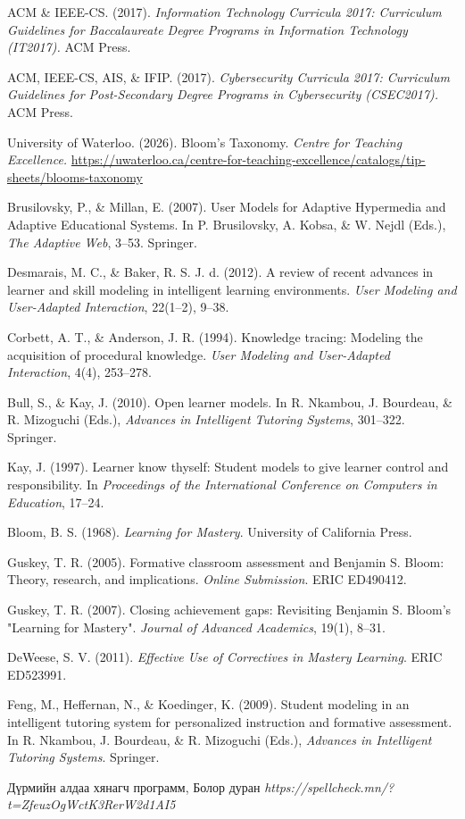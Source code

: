 \documentclass[12pt,A4]{report}
\begin{document}
\begin{thebibliography}{}
ACM \& IEEE-CS. (2017).
\textit{Information Technology Curricula 2017: Curriculum Guidelines for Baccalaureate Degree Programs in Information Technology (IT2017).}
ACM Press.

ACM, IEEE-CS, AIS, \& IFIP. (2017).
\textit{Cybersecurity Curricula 2017: Curriculum Guidelines for Post-Secondary Degree Programs in Cybersecurity (CSEC2017).}
ACM Press.

University of Waterloo. (2026).
Bloom's Taxonomy.
\textit{Centre for Teaching Excellence.}
\url{https://uwaterloo.ca/centre-for-teaching-excellence/catalogs/tip-sheets/blooms-taxonomy}

Brusilovsky, P., \& Millan, E. (2007).
User Models for Adaptive Hypermedia and Adaptive Educational Systems.
In P. Brusilovsky, A. Kobsa, \& W. Nejdl (Eds.), \textit{The Adaptive Web}, 3--53. Springer.

Desmarais, M. C., \& Baker, R. S. J. d. (2012).
A review of recent advances in learner and skill modeling in intelligent learning environments.
\textit{User Modeling and User-Adapted Interaction}, 22(1--2), 9--38.

Corbett, A. T., \& Anderson, J. R. (1994).
Knowledge tracing: Modeling the acquisition of procedural knowledge.
\textit{User Modeling and User-Adapted Interaction}, 4(4), 253--278.

Bull, S., \& Kay, J. (2010).
Open learner models.
In R. Nkambou, J. Bourdeau, \& R. Mizoguchi (Eds.), \textit{Advances in Intelligent Tutoring Systems}, 301--322. Springer.

Kay, J. (1997).
Learner know thyself: Student models to give learner control and responsibility.
In \textit{Proceedings of the International Conference on Computers in Education}, 17--24.

Bloom, B. S. (1968).
\textit{Learning for Mastery}.
University of California Press.

Guskey, T. R. (2005).
Formative classroom assessment and Benjamin S. Bloom: Theory, research, and implications.
\textit{Online Submission}. ERIC ED490412.

Guskey, T. R. (2007).
Closing achievement gaps: Revisiting Benjamin S. Bloom's "Learning for Mastery".
\textit{Journal of Advanced Academics}, 19(1), 8--31.

DeWeese, S. V. (2011).
\textit{Effective Use of Correctives in Mastery Learning}.
ERIC ED523991.

Feng, M., Heffernan, N., \& Koedinger, K. (2009).
Student modeling in an intelligent tutoring system for personalized instruction and formative assessment.
In R. Nkambou, J. Bourdeau, \& R. Mizoguchi (Eds.), \textit{Advances in Intelligent Tutoring Systems}. Springer.

 Дүрмийн алдаа хянагч программ, Болор дуран \textit{https://spellcheck.mn/?t=ZfeuzOgWctK3RerW2d1AI5}

\end{thebibliography}
\end{document}
